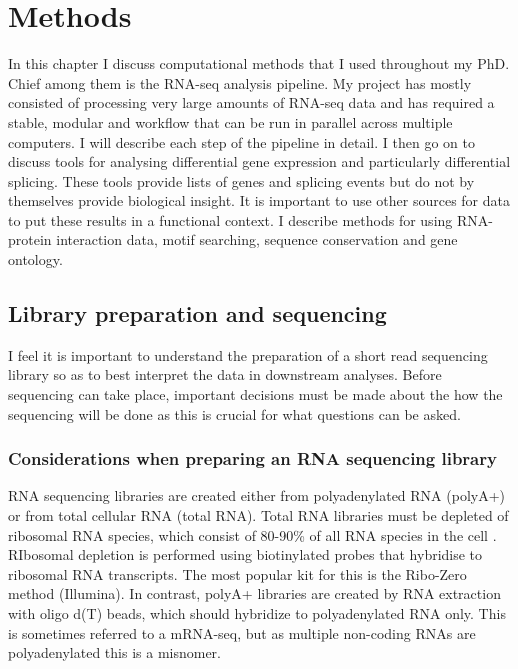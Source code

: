 
\chapter{Methods}
\label{chapter:methods}

In this chapter I discuss computational methods that I used throughout my PhD. 
Chief among them is the RNA-seq analysis pipeline. 
My project has mostly consisted of processing very large amounts of RNA-seq data and has required a stable, modular and workflow that can be run in parallel across multiple computers.
I will describe each step of the pipeline in detail.
I then go on to discuss tools for analysing differential gene expression and particularly differential splicing.
These tools provide lists of genes and splicing events but do not by themselves provide biological insight.
It is important to use other sources for data to put these results in a functional context. 
I describe methods for using RNA-protein interaction data, motif searching, sequence conservation and gene ontology.

\section{Library preparation and sequencing}
I feel it is important to understand the preparation of a short read sequencing library so as to best interpret the data in downstream analyses. 
Before sequencing can take place, important decisions must be made about the how the sequencing will be done as this is crucial for what questions can be asked. 

\subsection{Considerations when preparing an RNA sequencing library}

RNA sequencing libraries are created either from polyadenylated RNA (polyA+) or from total cellular RNA (total RNA).
Total RNA libraries must be depleted of ribosomal RNA species, which consist of 80-90\% of all RNA species in the cell \citep{Wilhelm2009}. %
RIbosomal depletion is performed using biotinylated probes that hybridise to ribosomal RNA transcripts. The most popular kit for this is the Ribo-Zero method (Illumina).
In contrast, polyA+ libraries are created  by RNA extraction with oligo d(T) beads, which should hybridize to polyadenylated RNA only. 
This is sometimes referred to a mRNA-seq, but as multiple non-coding RNAs are polyadenylated this is a misnomer.

